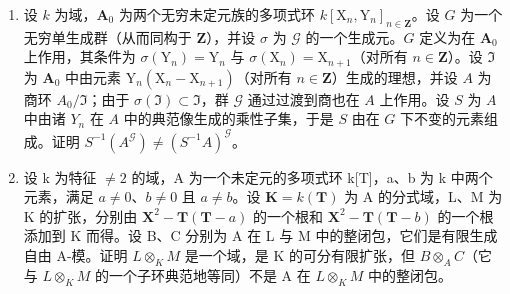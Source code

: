 \begin{enumerate}
\def\labelenumi{\arabic{enumi}.}
\setcounter{enumi}{27}
\item
  设 \(k\) 为域，\(\mathbf{A}_0\) 为两个无穷未定元族的多项式环 \(k[\mathrm{X}_n, \mathrm{Y}_n]_{n \in \mathbf{Z}}\)。设 \(G\) 为一个无穷单生成群（从而同构于 \(\mathbf{Z}\)），并设 \(\sigma\) 为 \(\mathcal{G}\) 的一个生成元。\(G\) 定义为在 \(\mathbf{A}_0\) 上作用，其条件为 \(\sigma(\mathrm{Y}_n) = \mathrm{Y}_n\) 与 \(\sigma(\mathrm{X}_n) = \mathrm{X}_{n+1}\)（对所有 \(n \in \mathbf{Z}\)）。设 \(\Im\) 为 \(\mathbf{A}_0\) 中由元素 \(\mathrm{Y}_n(\mathrm{X}_n - \mathrm{X}_{n+1})\)（对所有 \(n \in \mathbf{Z}\)）生成的理想，并设 \(A\) 为商环 \(A_0 / \Im\)；由于 \(\sigma(\Im) \subset \Im\)，群 \(\mathcal{G}\) 通过过渡到商也在 \(A\) 上作用。设 \(S\) 为 \(A\) 中由诸 \(Y_n\) 在 \(A\) 中的典范像生成的乘性子集，于是 \(S\) 由在 \(G\) 下不变的元素组成。证明 \(S^{-1}(A^{\mathcal{G}}) \neq (S^{-1}A)^{\mathcal{G}}\)。
\item
  设 k 为特征 \(\neq2\) 的域，A 为一个未定元的多项式环 k{[}T{]}，a、b 为 k 中两个元素，满足 \(a\neq0\)、\(b\neq0\) 且 \(a\neq b\)。设 \(\mathbf{K}=k(\mathbf{T})\) 为 A 的分式域，L、M 为 K 的扩张，分别由 \(\mathbf{X}^{2}-\mathbf{T}(\mathbf{T}-a)\) 的一个根和 \(\mathbf{X}^{2}-\mathbf{T}(\mathbf{T}-b)\) 的一个根添加到 K 而得。设 B、C 分别为 A 在 L 与 M 中的整闭包，它们是有限生成自由 A-模。证明 \(L\otimes_{K}M\) 是一个域，是 K 的可分有限扩张，但 \(B\otimes_{A}C\)（它与 \(L\otimes_{K}M\) 的一个子环典范地等同）不是 A 在 \(L\otimes_{K}M\) 中的整闭包。
\end{enumerate}
